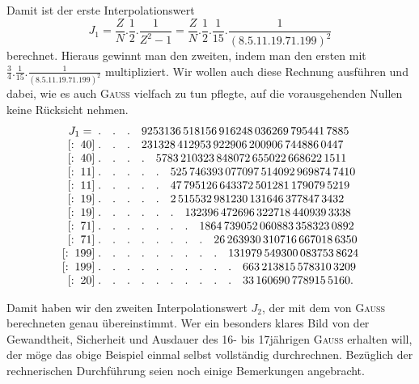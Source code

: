 \clearpage{}
\noindent\hspace*{\parindent}Damit ist der erste Interpolationswert
\[
J_1=\frac{Z}{N}\mathord{.}\frac{1}{2}\mathord{.}\frac{1}{Z^2-1}=\frac{Z}{N}\mathord{.}\frac{1}{2}\mathord{.}\frac{1}{15}\mathord{.}\frac{1}{(8\mathord{.}5\mathord{.}11\mathord{.}19\mathord{.}71\mathord{.}199)^2}
\]
\noindent berechnet. Hieraus gewinnt man den zweiten, indem man den ersten mit\linebreak
$\frac{3}{4}\mathord{.}\frac{1}{15}\mathord{.}\frac{1}{(8\mathord{.}5\mathord{.}11\mathord{.}19\mathord{.}71\mathord{.}199)^2}$ multipliziert. Wir wollen auch diese Rechnung ausführen und dabei, wie es auch \textsc{Gauss} vielfach zu tun pflegte, auf die vorausgehenden Nullen keine Rücksicht nehmen.
\begingroup\small\setlength{\arraycolsep}{3pt}\renewcommand{\arraystretch}{1.2}
\[
\begin{array}{r@{\;}l}
J_1={}&.\quad.\quad.\quad9253136\,518156\,916248\,036269\,795441\,7885\\
{}[:\;40]&.\quad.\quad.\quad231328\,412953\,922906\,200906\,744886\,0447\\
{}[:\;40]&.\quad.\quad.\quad.\quad5783\,210323\,848072\,655022\,668622\,1511\\
{}[:\;11]&.\quad.\quad.\quad.\quad.\quad525\,746393\,077097\,514092\,969874\,7410\\
{}[:\;11]&.\quad.\quad.\quad.\quad.\quad47\,795126\,643372\,501281\,179079\,5219\\
{}[:\;19]&.\quad.\quad.\quad.\quad.\quad2\,515532\,981230\,131646\,377847\,3432\\
{}[:\;19]&.\quad.\quad.\quad.\quad.\quad.\quad132396\,472696\,322718\,440939\,3338\\
{}[:\;71]&.\quad.\quad.\quad.\quad.\quad.\quad.\quad1864\,739052\,060883\,358323\,0892\\
{}[:\;71]&.\quad.\quad.\quad.\quad.\quad.\quad.\quad.\quad26\,263930\,310716\,667018\,6350\\
{}[:\;199]&.\quad.\quad.\quad.\quad.\quad.\quad.\quad.\quad.\quad131979\,549300\,083753\,8624\\
{}[:\;199]&.\quad.\quad.\quad.\quad.\quad.\quad.\quad.\quad.\quad.\quad663\,213815\,578310\,3209\\
{}[:\;20]&.\quad.\quad.\quad.\quad.\quad.\quad.\quad.\quad.\quad.\quad33\,160690\,778915\,5160.
\end{array}
\]
\endgroup
\par\noindent\hspace*{\parindent}Damit haben wir den zweiten Interpolationswert $J_2$, der mit dem von
\textsc{Gauss} berechneten genau übereinstimmt. Wer ein besonders klares Bild von
der Gewandtheit, Sicherheit und Ausdauer des 16- bis 17jährigen \textsc{Gauss} erhalten will, der möge das obige Beispiel einmal selbst vollständig durchrechnen.
Bezüglich der rechnerischen Durchführung seien noch einige Bemerkungen
angebracht.

